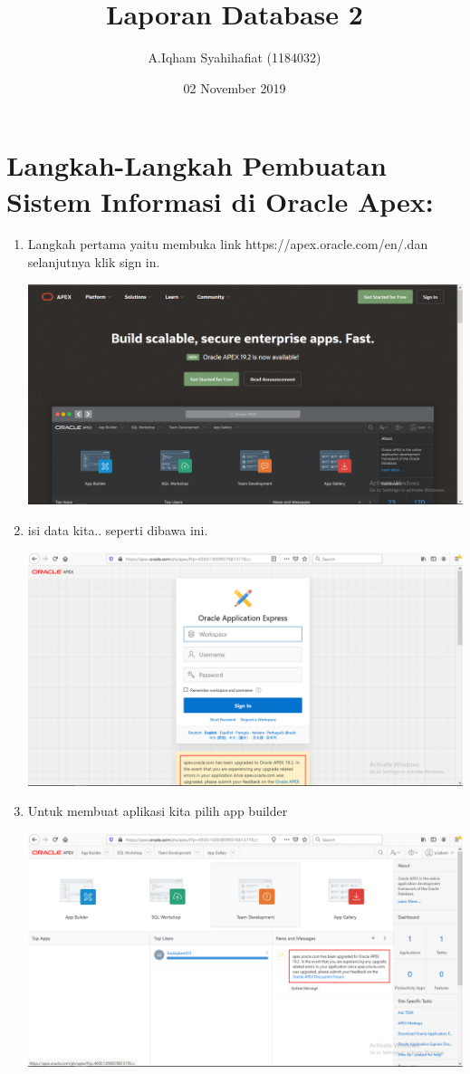 \documentclass{article}
\title{Laporan Database 2}
\author{A.Iqham Syahihafiat (1184032)}
\date{02 November 2019}
\begin{document}
\maketitle

\section{Langkah-Langkah Pembuatan Sistem Informasi di Oracle Apex:}
\begin{enumerate}
    \item Langkah pertama yaitu membuka link https://apex.oracle.com/en/.dan selanjutnya klik sign in.
  \begin{center}
    \includegraphics[width=.8\textwidth]{tb.PNG}
\end{center}
    \item isi data kita.. seperti dibawa ini.
    \begin{center}
    \includegraphics[width=.8\textwidth]{tb2.PNG}
\end{center}
    \item Untuk membuat aplikasi kita pilih app builder
    \begin{center}
    \includegraphics[width=.8\textwidth]{tb3.PNG}

\end{center}
\end{enumerate}
\end{document}
